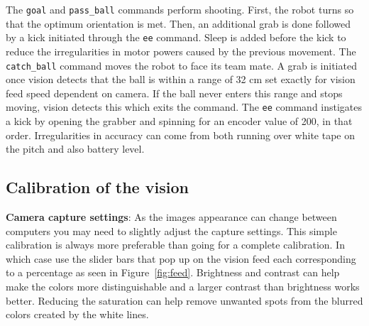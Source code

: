 \documentclass[a4paper,12pt]{article}
\begin{document}
The \texttt{goal} and \texttt{pass\_ball} commands perform shooting. First, the robot turns so that the optimum orientation is met. Then, an additional grab is done followed by a kick initiated through the \texttt{ee} command. Sleep is added before the kick to reduce the irregularities in motor powers caused by the previous movement. The \texttt{catch\_ball} command moves the robot to face its team mate. A grab is initiated once vision detects that the ball is within a range of 32 cm set exactly for vision feed speed dependent on camera. If the ball never enters this range and stops moving, vision detects this which exits the command. The \texttt{ee} command instigates a kick by opening the grabber and spinning for an encoder value of 200, in that order. Irregularities in accuracy can come from both running over white tape on the pitch and also battery level.


\subsection{Calibration of the vision} \label{calibration}

\textbf{Camera capture settings}: As the images appearance can change between computers you may need to slightly adjust the capture settings. This simple calibration is always more preferable than going for a complete calibration. In which case use the slider bars that pop up on the vision feed each corresponding to a percentage as seen in Figure~\ref{fig:feed}. Brightness and contrast can help make the colors more distinguishable and a larger contrast than brightness works better. Reducing the saturation can help remove unwanted spots from the blurred colors created by the white lines.   
\end{document}
